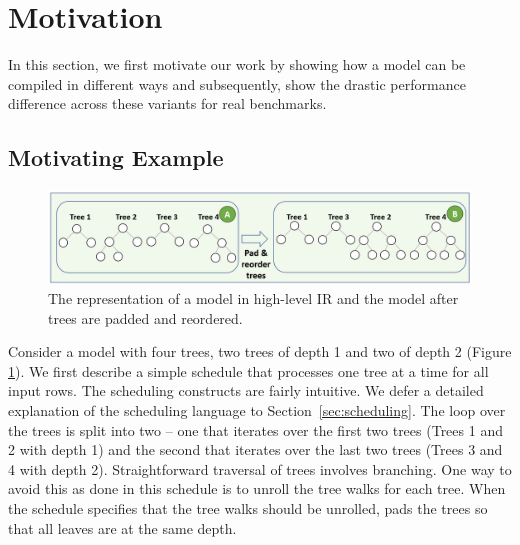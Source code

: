 \section{Motivation}
\label{sec:motivation}
In this section, we first motivate our work by showing how a model can be compiled in different ways
and subsequently, show the drastic performance difference across these variants for real benchmarks.

\subsection{Motivating Example}
\begin{figure}[htb]
  \centering
  \includegraphics[width=\linewidth]{figures/HIR.PNG}
  \caption{The representation of a model in high-level IR and the model 
  after trees are padded and reordered. }
  \label{Fig:HIRExample}
\end{figure}

Consider a model with four trees, two 
trees of depth 1 and two of depth 2 (Figure \ref{Fig:HIRExample}).
We first describe a simple schedule that processes one tree at a time 
for all input rows. The scheduling constructs are fairly intuitive. We 
defer a detailed explanation of the scheduling language to Section~\ref{sec:scheduling}. 
The loop over the trees is split into two -- one that
iterates over the first two trees (Trees 1 and 2 with depth 1) and 
the second that iterates over the last two trees (Trees 3 and 4 with
depth 2). Straightforward traversal of trees involves branching. 
One way to avoid this as done in this schedule is to unroll the 
tree walks for each tree. 
When the schedule specifies that the tree walks should be unrolled, 
\Treebeard{} pads the trees so that all leaves are at the same depth.

